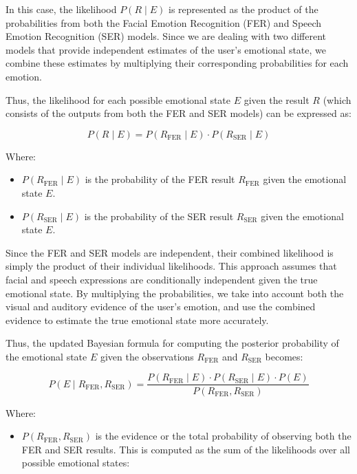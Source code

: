 In this case, the likelihood \( P(R \mid E) \) is represented as the product of the probabilities from both the Facial Emotion Recognition (FER) and Speech Emotion Recognition (SER) models. Since we are dealing with two different models that provide independent estimates of the user’s emotional state, we combine these estimates by multiplying their corresponding probabilities for each emotion.

Thus, the likelihood for each possible emotional state \( E \) given the result \( R \) (which consists of the outputs from both the FER and SER models) can be expressed as:

\[
P(R \mid E) = P(R_{\text{FER}} \mid E) \cdot P(R_{\text{SER}} \mid E)
\]

Where:
\begin{itemize}
    \item \( P(R_{\text{FER}} \mid E) \) is the probability of the FER result \( R_{\text{FER}} \) given the emotional state \( E \).
    \item \( P(R_{\text{SER}} \mid E) \) is the probability of the SER result \( R_{\text{SER}} \) given the emotional state \( E \).
\end{itemize}

Since the FER and SER models are independent, their combined likelihood is simply the product of their individual likelihoods. This approach assumes that facial and speech expressions are conditionally independent given the true emotional state. By multiplying the probabilities, we take into account both the visual and auditory evidence of the user’s emotion, and use the combined evidence to estimate the true emotional state more accurately.

Thus, the updated Bayesian formula for computing the posterior probability of the emotional state \( E \) given the observations \( R_{\text{FER}} \) and \( R_{\text{SER}} \) becomes:

\[
P(E \mid R_{\text{FER}}, R_{\text{SER}}) = \frac{P(R_{\text{FER}} \mid E) \cdot P(R_{\text{SER}} \mid E) \cdot P(E)}{P(R_{\text{FER}}, R_{\text{SER}})}
\]

Where:
\begin{itemize}
    \item \( P(R_{\text{FER}}, R_{\text{SER}}) \) is the evidence or the total probability of observing both the FER and SER results. This is computed as the sum of the likelihoods over all possible emotional states:
\end{itemize}

